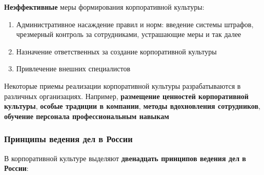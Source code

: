 \textbf{Неэффективные} меры формирования корпоративной культуры:

\begin{enumerate}
    \item Административное насаждение правил и норм: введение системы штрафов, чрезмерный контроль за сотрудниками, устрашающие меры и так далее
    \item Назначение ответственных за создание корпоративной культуры
    \item Привлечение внешних специалистов
\end{enumerate}

Некоторые приемы реализации корпоративной культуры разрабатываются в различных организациях. Например, \textbf{размещение ценностей корпоративной культуры}, \textbf{особые традиции в компании}, \textbf{методы вдохновления сотрудников}, \textbf{обучение персонала профессиональным навыкам}

\subsubsection{Принципы ведения дел в России}

В корпоративной культуре выделяют \textbf{двенадцать принципов ведения дел в России}:


